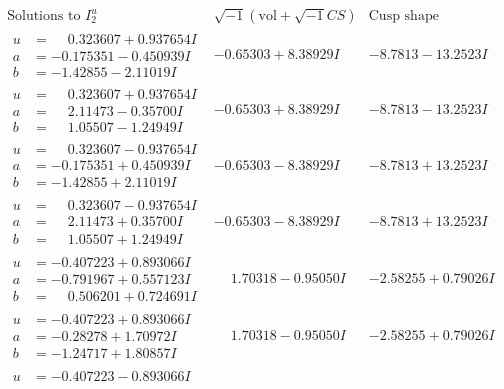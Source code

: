 \documentclass[1p]{elsarticle_modified}
\theoremstyle{definition}
\newcommand{\I}{\sqrt{-1}}
\begin{document}
$$\begin{array}{c|c|c}  
\text{Solutions to }I^u_{2}& \I (\text{vol} + \sqrt{-1}CS) & \text{Cusp shape}\\
 \hline 
\begin{aligned}
u &= \phantom{-}0.323607 + 0.937654 I \\
a &= -0.175351 - 0.450939 I \\
b &= -1.42855 - 2.11019 I\end{aligned}
 & -0.65303 + 8.38929 I & -8.7813 - 13.2523 I \\ \hline\begin{aligned}
u &= \phantom{-}0.323607 + 0.937654 I \\
a &= \phantom{-}2.11473 - 0.35700 I \\
b &= \phantom{-}1.05507 - 1.24949 I\end{aligned}
 & -0.65303 + 8.38929 I & -8.7813 - 13.2523 I \\ \hline\begin{aligned}
u &= \phantom{-}0.323607 - 0.937654 I \\
a &= -0.175351 + 0.450939 I \\
b &= -1.42855 + 2.11019 I\end{aligned}
 & -0.65303 - 8.38929 I & -8.7813 + 13.2523 I \\ \hline\begin{aligned}
u &= \phantom{-}0.323607 - 0.937654 I \\
a &= \phantom{-}2.11473 + 0.35700 I \\
b &= \phantom{-}1.05507 + 1.24949 I\end{aligned}
 & -0.65303 - 8.38929 I & -8.7813 + 13.2523 I \\ \hline\begin{aligned}
u &= -0.407223 + 0.893066 I \\
a &= -0.791967 + 0.557123 I \\
b &= \phantom{-}0.506201 + 0.724691 I\end{aligned}
 & \phantom{-}1.70318 - 0.95050 I & -2.58255 + 0.79026 I \\ \hline\begin{aligned}
u &= -0.407223 + 0.893066 I \\
a &= -0.28278 + 1.70972 I \\
b &= -1.24717 + 1.80857 I\end{aligned}
 & \phantom{-}1.70318 - 0.95050 I & -2.58255 + 0.79026 I \\ \hline\begin{aligned}
u &= -0.407223 - 0.893066 I \\

\end{aligned}
\end{array}$$
\end{document}
